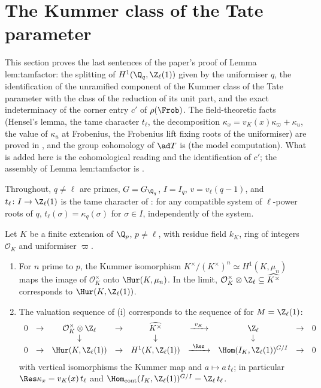 \section{The Kummer class of the Tate parameter}\label{sec:galcoh:tate}

This section proves the last sentences of the paper's proof of Lemma lem:tamfactor: the splitting of $H^1(\Q_q,\Z_\ell(1))$ given by the uniformiser $q$, the
identification of the unramified component of the Kummer class of the Tate parameter with the class of the reduction of its unit part, and the exact
indeterminacy of the corner entry $c'$ of $\rho(\Frob)$. The field-theoretic facts (Hensel's lemma, the tame character $t_\ell$, the decomposition
$\kappa_x=v_K(x)\kappa_\varpi+\kappa_u$, the value of $\kappa_u$ at Frobenius, the Frobenius lift fixing roots of the uniformiser) are proved in , and
the group cohomology of $\ad T$ is  (the model computation). What is added here is the cohomological reading and the identification of $c'$; the assembly of Lemma lem:tamfactor is .

Throughout, $q\ne\ell$ are primes, $G=G_{\Q_q}$, $I=I_q$, $v=v_\ell(q-1)$, and $t_\ell\colon I\to\Z_\ell(1)$ is the tame character of : for any compatible
system of $\ell$-power roots of $q$, $t_\ell(\sigma)=\kappa_q(\sigma)$ for $\sigma\in I$, independently of the system.

\begin{proposition}\label{prop:galcoh:unit-classes}
Let $K$ be a finite extension of $\Q_p$, $p\ne\ell$, with residue field $k_K$, ring of integers $\mathcal O_K$ and uniformiser $\varpi$.
\begin{enumerate}[label=(\roman*)]
\item For $n$ prime to $p$, the Kummer isomorphism $K^\times/(K^\times)^n\simeq H^1(K,\mu_n)$ maps the image of $\mathcal O_K^\times$ onto $\Hur(K,\mu_n)$. In the limit,
$\mathcal O_K^\times\otimes\Z_\ell\subseteq\widehat{K^\times}$ corresponds to $\Hur(K,\Z_\ell(1))$.
\item The valuation sequence of (i) corresponds to the sequence of  for $M=\Z_\ell(1)$:
\[
\begin{array}{ccccccccc}
0&\to&\mathcal O_K^\times\otimes\Z_\ell&\to&\widehat{K^\times}&\xrightarrow{\ v_K\ }&\Z_\ell&\to&0\\
&&\downarrow&&\downarrow&&\downarrow&&\\
0&\to&\Hur(K,\Z_\ell(1))&\to&H^1(K,\Z_\ell(1))&\xrightarrow{\ \Res\ }&\Hom(I_K,\Z_\ell(1))^{G/I}&\to&0
\end{array}
\]
with vertical isomorphisms the Kummer map and $a\mapsto a\,t_\ell$; in particular $\Res\kappa_x=v_K(x)\,t_\ell$ and $\Hom_{\mathrm{cont}}(I_K,\Z_\ell(1))^{G/I}=\Z_\ell\,t_\ell$.
\end{enumerate}
\end{proposition}

